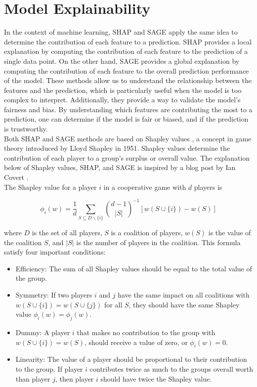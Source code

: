 \section{Model Explainability}
In the context of machine learning, SHAP \cite{SHAP} and SAGE \cite{SAGE} apply the same idea to determine the contribution of each feature to a prediction.
SHAP provides a local explanation by computing the contribution of each feature to the prediction of a single data point.
On the other hand, SAGE provides a global explanation by computing the contribution of each feature to the overall prediction performance of the model.
These methods allow us to understand the relationship between the features and the prediction, which is particularly useful when the model is too complex to interpret.
Additionally, they provide a way to validate the model's fairness and bias.
By understanding which features are contributing the most to a prediction, one can determine if the model is fair or biased, and if the prediction is trustworthy.\\

Both SHAP and SAGE methods are based on Shapley values \cite{shapley_value_1953}, a concept in game theory introduced by Lloyd Shapley in 1951.
Shapley values determine the contribution of each player to a group's surplus or overall value.
The explanation below of Shapley values, SHAP, and SAGE is inspired by a blog post by Ian Covert \cite{covert_shap_sage}.\\

The Shapley value for a player $i$ in a cooperative game with $d$ players is

\begin{equation}
    \phi_i(w) = \frac{1}{d} \sum_{S \subseteq D \backslash \{ i \} } \binom{d-1}{|S|}^{-1} \left[ w(S\cup \{ i \} ) - w(S) \right]
\end{equation}

where $D$ is the set of all players, $S$ is a coalition of players, $w(S)$ is the value of the coalition $S$, and $|S|$ is the number of players in the coalition.
This formula satisfy four important conditions:
\begin{itemize}
    \item Efficiency: The sum of all Shapley values should be equal to the total value of the group.
    \item Symmetry: If two players $i$ and $j$ have the same impact on all coalitions with $w(S \cup \{i\}) = w(S \cup \{j\})$ for all $S$, they should have the same Shapley value $\phi_i(w) = \phi_j(w)$.
    \item Dummy: A player $i$ that makes no contribution to the group with $w(S \cup \{i\}) = w(S)$, should receive a value of zero, or $\phi_i(w)=0$.
    \item Linearity: The value of a player should be proportional to their contribution to the group.
If player $i$ contributes twice as much to the groups overall worth than player $j$, then player $i$ should have twice the Shapley value.
\end{itemize}

